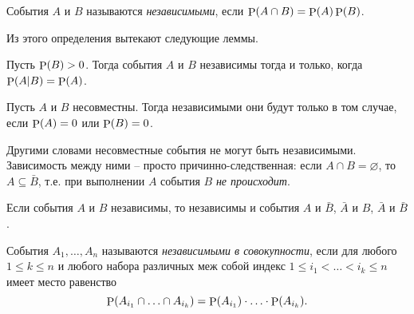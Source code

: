\begin{to_def}
    События $A$ и $B$ называются \textit{независимыми}, если $\P(A \cap B) = \P(A) \P(B)$.
\end{to_def}
\noindent
Из этого определения вытекают следующие леммы.
\begin{to_lem}
    Пусть $\P(B) > 0$. Тогда события $A$ и $B$ независимы тогда и только, когда $\P(A|B) = \P(A)$. 
\end{to_lem}
\begin{to_lem}
    Пусть $A$ и $B$ несовместны. Тогда независимыми они будут только в том случае, если $\P(A) = 0$ или $\P(B) = 0$.
\end{to_lem}

Другими словами несовместные события не могут быть независимыми. Зависимость между ними -- просто причинно-следственная: если $A\cap B = \varnothing$, то $A \subseteq \bar{B}$, т.е. при выполнении $A$ события $B$  \textit{не происходит}.


\begin{to_lem}
    Если события $A$ и $B$ независимы, то независимы и события $A$ и $\bar{B}$, $\bar{A}$ и $B$, $\bar{A}$ и $\bar{B}$.
\end{to_lem}


\begin{to_def}
    События $A_1, \ldots, A_n$ называются \textit{независимыми в совокупности}, если для любого $1 \leq k \leq n$ и любого набора различных меж собой индекс $1 \leq i_1 < \ldots < i_k \leq n$ имеет место равенство
    \begin{equation*}
        \P(A_{i_1} \cap \ldots \cap A_{i_k}) = \P (A_{i_1}) \cdot \ldots \cdot \P(A_{i_k}).
    \end{equation*}
\end{to_def}